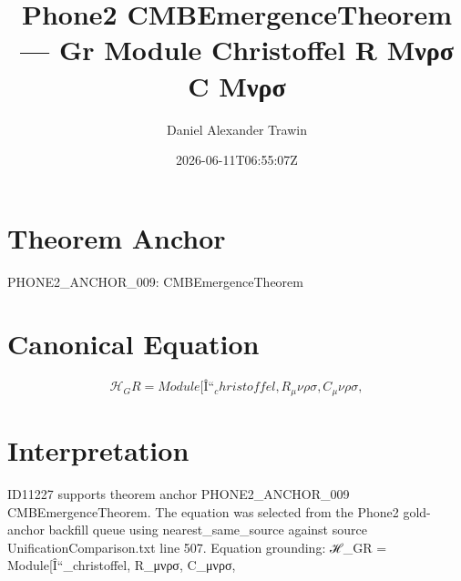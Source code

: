 \documentclass[11pt]{article}
\title{Phone2 CMBEmergenceTheorem — Gr Module Christoffel R Μνρσ C Μνρσ}
\author{Daniel Alexander Trawin}
\date{2026-06-11T06:55:07Z}
\begin{document}
\maketitle
\section*{Theorem Anchor}
PHONE2_ANCHOR_009: CMBEmergenceTheorem
\section*{Canonical Equation}
\[
ℋ_GR = Module[{Î“_christoffel, R_μνρσ, C_μνρσ},
\]
\section*{Interpretation}
ID11227 supports theorem anchor PHONE2_ANCHOR_009 CMBEmergenceTheorem. The equation was selected from the Phone2 gold-anchor backfill queue using nearest_same_source against source UnificationComparison.txt line 507. Equation grounding: ℋ_GR = Module[{Î“_christoffel, R_μνρσ, C_μνρσ},
\end{document}
